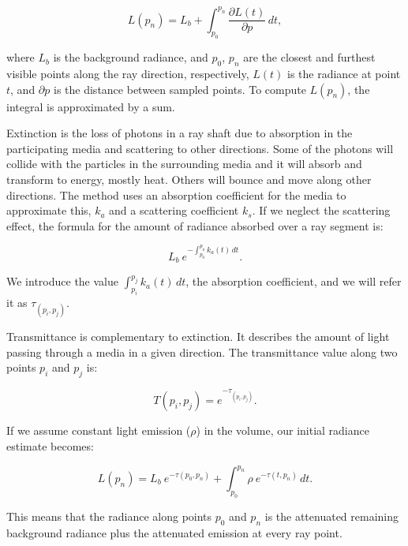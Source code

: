 \documentclass[oneside,a4paper,english,links]{amca}
\begin{document}
\begin{equation} \label{eq:general_radiance}  
  L(p_n) = L_b + \int_{p_0}^{p_n} \frac{\partial L(t)}{\partial p} \, dt,
\end{equation}

\noindent where $L_b$ is the background radiance, and $p_0$, $p_n$ are the
closest and furthest visible points along the ray direction,
respectively, $L(t)$ is the radiance at point $t$, and
$\partial p$ is the distance between sampled points. To compute $L(p_n)$, the integral is approximated by a sum.

Extinction is the loss of photons in a ray shaft due to absorption in
the participating media and scattering to other directions. Some of
the photons will collide with the particles in the
surrounding media and it will absorb and transform to energy, mostly
heat. Others will bounce and move along other directions. The method uses an absorption coefficient for the media to approximate this, $k_a$
and a scattering coefficient $k_s$. If we neglect the scattering effect, the formula for the amount of radiance absorbed over a ray segment is:

\begin{equation} \label{eq:radiance_absorption}  
    L_b \ \displaystyle e^{-\int_{p_0}^{p_n} k_a(t) \, dt}.
\end{equation}

We introduce the value $\int_{p_i}^{p_j} k_a(t) \, dt$, the absorption coefficient, and we will refer it as $\tau_{(p_i, p_j)}$.

Transmittance is complementary to extinction. It describes
the amount of light passing through a media in a given
direction. The transmittance value along two points $p_i$ and $p_j$
is:

\begin{equation} \label{eq:general_radiance}  
  T(p_i,p_j) = e^{-\tau_{(p_i, p_j)}}.
\end{equation}

If we assume constant light emission ($\rho$) in the volume, our initial radiance estimate becomes:

\begin{equation} \label{eq:ray_radiance}  
  L(p_n) = L_b \ e^{-\tau(p_0, p_n)} + \int_{p_0}^{p_n} \rho \ e^{-\tau(t,p_n)} \, dt.
\end{equation}

This means that the radiance along points $p_0$ and
$p_n$ is the attenuated remaining background radiance plus the
attenuated emission at every ray point.
\end{document}
